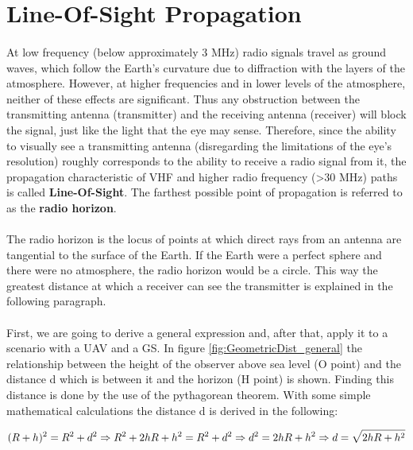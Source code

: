 \section{Line-Of-Sight Propagation}\label{subsec:los_propagation}
\paragraph{}At low frequency (below approximately 3 MHz) radio signals travel as ground waves, which follow the Earth's curvature due to diffraction with the layers of the atmosphere.
However, at higher frequencies and in lower levels of the atmosphere, neither of these effects are significant. Thus any obstruction between the transmitting antenna (transmitter) and the receiving antenna (receiver) will block the signal, just like the light that the eye may sense. Therefore, since the ability to visually see a transmitting antenna (disregarding the limitations of the eye's resolution) roughly corresponds to the ability to receive a radio signal from it, the propagation characteristic of VHF and higher radio frequency (>30 MHz) paths is called \textbf{Line-Of-Sight}. The farthest possible point of propagation is referred to as the \textbf{radio horizon}.

\paragraph{}The radio horizon is the locus of points at which direct rays from an antenna are tangential to the surface of the Earth. If the Earth were a perfect sphere and there were no atmosphere, the radio horizon would be a circle.
This way the greatest distance at which a receiver can see the transmitter is explained in the following paragraph.

\paragraph{}First, we are going to derive a general expression and, after that, apply it to a scenario with a UAV and a GS. In figure  \ref{fig:GeometricDist_general} the relationship between the height of the observer above sea level (O point) and the distance d which is between it and the horizon (H point) is shown. Finding this distance is done by the use of the pythagorean theorem. With some simple mathematical calculations the distance d is derived in the following:

\begin{equation}\label{eq:los_distToHorizon}
	(R+h)^2 = R^2+d^2\nonumber \\
	\Rightarrow R^2+2hR+h^2 = R^2+d^2 \Rightarrow d^2 = 2hR + h^2 \\
	\Rightarrow d = \sqrt{2hR + h^2}
\end{equation} 

